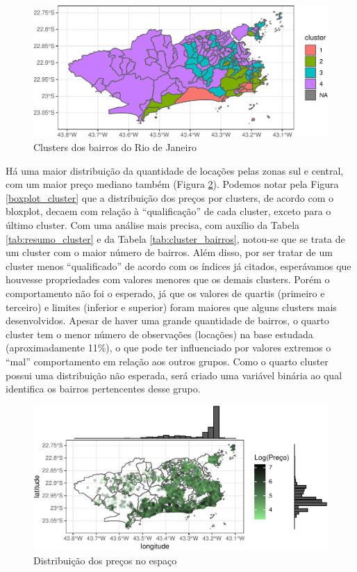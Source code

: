 \documentclass[
	12pt,				%
	a4paper,		%
	oneside,    %
	chapter=TITLE,		   %
	section=TITLE,		   %
	subsection=TITLE,	   %
	subsubsection=TITLE, %
	english,			%
	french,				%
	spanish,			%
	brazil,				%
]{abntex2}
\begin{document}
\begin{figure}
\centering
\includegraphics{00-TCC_files/figure-latex/clusters_bairros-1.pdf}
\caption{\label{clusters_bairros}Clusters dos bairros do Rio de Janeiro}
\end{figure}

Há uma maior distribuição da quantidade de locações pelas zonas sul e
central, com um maior preço mediano também (Figura
\ref{dist_preco_espaco}). Podemos notar pela Figura
\ref{boxplot_cluster} que a distribuição dos preços por clusters, de
acordo com o bloxplot, decaem com relação à ``qualificação'' de cada
cluster, exceto para o último cluster. Com uma análise mais precisa, com
auxílio da Tabela \ref{tab:resumo_cluster} e da Tabela
\ref{tab:cluster_bairros}, notou-se que se trata de um cluster com o
maior número de bairros. Além disso, por ser tratar de um cluster menos
``qualificado'' de acordo com os índices já citados, esperávamos que
houvesse propriedades com valores menores que os demais clusters. Porém
o comportamento não foi o esperado, já que os valores de quartis
(primeiro e terceiro) e limites (inferior e superior) foram maiores que
alguns clusters mais desenvolvidos. Apesar de haver uma grande
quantidade de bairros, o quarto cluster tem o menor número de
observações (locações) na base estudada (aproximadamente 11\%), o que
pode ter influenciado por valores extremos o ``mal'' comportamento em
relação aos outros grupos. Como o quarto cluster possui uma distribuição
não esperada, será criado uma variável binária ao qual identifica os
bairros pertencentes desse grupo.

\begin{figure}
\centering
\includegraphics{00-TCC_files/figure-latex/dist_preco_espaco-1.pdf}
\caption{\label{dist_preco_espaco}Distribuição dos preços no espaço}
\end{figure}
\end{document}
